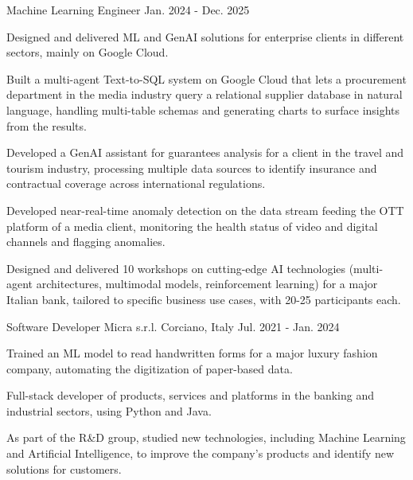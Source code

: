 \begin{cventries}
  \cventry
    {Machine Learning Engineer} %
    {} %
    {} %
    {Jan. 2024 - Dec. 2025} %
    {
      \begin{cvitems} %
        \item {Designed and delivered ML and GenAI solutions for enterprise clients in different sectors, mainly on Google Cloud.}
        \item {Built a multi-agent Text-to-SQL system on Google Cloud that lets a procurement department in the media industry query a relational supplier database in natural language, handling multi-table schemas and generating charts to surface insights from the results.}
        \item {Developed a GenAI assistant for guarantees analysis for a client in the travel and tourism industry, processing multiple data sources to identify insurance and contractual coverage across international regulations.}
        \item {Developed near-real-time anomaly detection on the data stream feeding the OTT platform of a media client, monitoring the health status of video and digital channels and flagging anomalies.}
        \item {Designed and delivered 10 workshops on cutting-edge AI technologies (multi-agent architectures, multimodal models, reinforcement learning) for a major Italian bank, tailored to specific business use cases, with 20-25 participants each.}
      \end{cvitems}
    }

  \cventry
    {Software Developer} %
    {Micra s.r.l.} %
    {Corciano, Italy} %
    {Jul. 2021 - Jan. 2024} %
    {
      \begin{cvitems} %
        \item {Trained an ML model to read handwritten forms for a major luxury fashion company, automating the digitization of paper-based data.}
        \item {Full-stack developer of products, services and platforms in the banking and industrial sectors, using Python and Java.}
        \item {As part of the R\&D group, studied new technologies, including Machine Learning and Artificial Intelligence, to improve the company's products and identify new solutions for customers.}
      \end{cvitems}
    }

\end{cventries}

